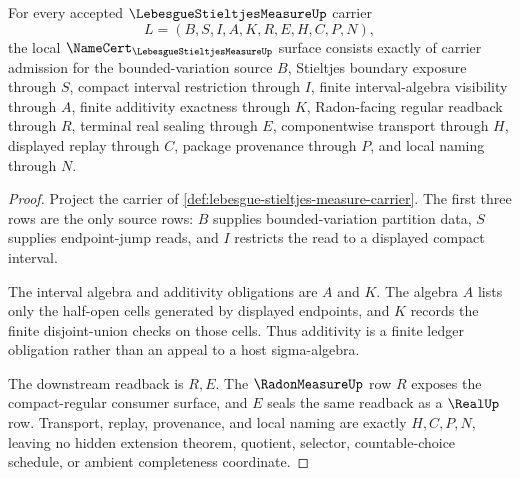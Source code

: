 \begin{theorem}
\label{thm:lebesgue-stieltjes-measure-namecert-obligations}
For every accepted $\LebesgueStieltjesMeasureUp$ carrier
$$
L=(B,S,I,A,K,R,E,H,C,P,N),
$$
the local $\NameCert_{\LebesgueStieltjesMeasureUp}$ surface consists exactly of carrier admission for the bounded-variation source $B$, Stieltjes boundary exposure through $S$, compact interval restriction through $I$, finite interval-algebra visibility through $A$, finite additivity exactness through $K$, Radon-facing regular readback through $R$, terminal real sealing through $E$, componentwise transport through $H$, displayed replay through $C$, package provenance through $P$, and local naming through $N$.
\end{theorem}
\begin{proof}
Project the carrier of \autoref{def:lebesgue-stieltjes-measure-carrier}. The first three rows are the only source rows: $B$ supplies bounded-variation partition data, $S$ supplies endpoint-jump reads, and $I$ restricts the read to a displayed compact interval.

The interval algebra and additivity obligations are $A$ and $K$. The algebra $A$ lists only the half-open cells generated by displayed endpoints, and $K$ records the finite disjoint-union checks on those cells. Thus additivity is a finite ledger obligation rather than an appeal to a host sigma-algebra.

The downstream readback is $R,E$. The $\RadonMeasureUp$ row $R$ exposes the compact-regular consumer surface, and $E$ seals the same readback as a $\RealUp$ row. Transport, replay, provenance, and local naming are exactly $H,C,P,N$, leaving no hidden extension theorem, quotient, selector, countable-choice schedule, or ambient completeness coordinate.
\end{proof}

